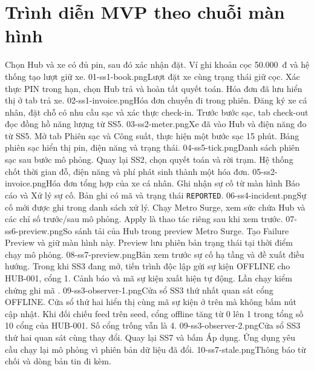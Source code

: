 \chapter{Trình diễn MVP theo chuỗi màn hình}
\label{chap:demo}
\begin{landscape}
  {Chọn Hub và xe có đủ pin, sau đó xác nhận đặt. Ví ghi khoản cọc 50.000~đ và hệ thống tạo lượt giữ xe.}
  {01-ss1-book.png}{Lượt đặt xe cùng trạng thái giữ cọc.}
  {Xác thực PIN trong hạn, chọn Hub trả và hoàn tất quyết toán. Hóa đơn đã lưu hiển thị ở tab trả xe.}
  {02-ss1-invoice.png}{Hóa đơn chuyến đi trong phiên.}
  {Đăng ký xe cá nhân, đặt chỗ có nhu cầu sạc và xác thực check-in. Trước bước sạc, tab check-out đọc đồng hồ năng lượng từ SS5.}
  {03-ss2-meter.png}{Xe đã vào Hub và điện năng đo từ SS5.}
  {Mở tab Phiên sạc và Công suất, thực hiện một bước sạc 15 phút. Bảng phiên sạc hiển thị pin, điện năng và trạng thái.}
  {04-ss5-tick.png}{Danh sách phiên sạc sau bước mô phỏng.}
  {Quay lại SS2, chọn quyết toán và rời trạm. Hệ thống chốt thời gian đỗ, điện năng và phí phát sinh thành một hóa đơn.}
  {05-ss2-invoice.png}{Hóa đơn tổng hợp của xe cá nhân.}
  {Ghi nhận sự cố từ màn hình Báo cáo và Xử lý sự cố. Bản ghi có mã và trạng thái \texttt{REPORTED}.}
  {06-ss4-incident.png}{Sự cố mới được ghi trong danh sách xử lý.}
  {Chạy Metro Surge, xem sức chứa Hub và các chỉ số trước/sau mô phỏng. Apply là thao tác riêng sau khi xem trước.}
  {07-ss6-preview.png}{So sánh tải của Hub trong preview Metro Surge.}
  {Tạo Failure Preview và giữ màn hình này. Preview lưu phiên bản trạng thái tại thời điểm chạy mô phỏng.}
  {08-ss7-preview.png}{Bản xem trước sự cố hạ tầng và đề xuất điều hướng.}
  {Trong khi SS3 đang mở, tiến trình độc lập gửi sự kiện OFFLINE cho HUB-001, cổng 1. Cảnh báo và mã sự kiện xuất hiện tự động. Lần chạy kiểm chứng ghi mã .}
  {09-ss3-observer-1.png}{Cửa sổ SS3 thứ nhất quan sát cổng OFFLINE.}
  {Cửa sổ thứ hai hiển thị cùng mã sự kiện ở trên mà không bấm nút cập nhật. Khi đối chiếu feed trên seed, cổng offline tăng từ 0 lên 1 trong tổng số 10 cổng của HUB-001. Số cổng trống vẫn là 4.}
  {09-ss3-observer-2.png}{Cửa sổ SS3 thứ hai quan sát cùng thay đổi.}
  {Quay lại SS7 và bấm Áp dụng. Ứng dụng yêu cầu chạy lại mô phỏng vì phiên bản dữ liệu đã đổi.}
  {10-ss7-stale.png}{Thông báo từ chối và dòng bản tin đi kèm.}
\end{landscape}
